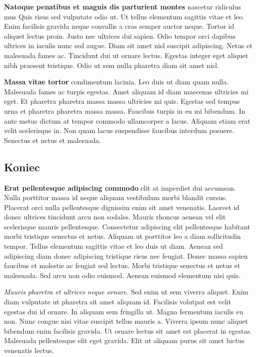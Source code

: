 \documentclass[]{article}
\begin{document}
\textbf{Natoque penatibus et magnis dis parturient montes} nascetur ridiculus mus Quis risus sed vulputate odio ut. Ut tellus elementum sagittis vitae et leo. Enim facilisis gravida neque convallis a cras semper auctor neque. Tortor id aliquet lectus proin. Justo nec ultrices dui sapien. Odio tempor orci dapibus ultrices in iaculis nunc sed augue. Diam sit amet nisl suscipit adipiscing. Netus et malesuada fames ac. Tincidunt dui ut ornare lectus. Egestas integer eget aliquet nibh praesent tristique. Odio ut sem nulla pharetra diam sit amet nisl.

\textbf{Massa vitae tortor} condimentum lacinia. Leo duis ut diam quam nulla. Malesuada fames ac turpis egestas. Amet aliquam id diam maecenas ultricies mi eget. Et pharetra pharetra massa massa ultricies mi quis. Egestas sed tempus urna et pharetra pharetra massa massa. Faucibus turpis in eu mi bibendum. In ante metus dictum at tempor commodo ullamcorper a lacus. Aliquam etiam erat velit scelerisque in. Non quam lacus suspendisse faucibus interdum posuere. Senectus et netus et malesuada.

\subsection{Koniec}
\textbf{Erat pellentesque adipiscing commodo }elit at imperdiet dui accumsan. 
Nulla porttitor massa id neque aliquam vestibulum morbi blandit cursus. Placerat orci nulla pellentesque dignissim enim sit amet venenatis. Laoreet id donec ultrices tincidunt arcu non sodales. Mauris rhoncus aenean vel elit scelerisque mauris pellentesque. Consectetur adipiscing elit pellentesque habitant morbi tristique senectus et netus. Aliquam ut porttitor leo a diam sollicitudin tempor. Tellus elementum sagittis vitae et leo duis ut diam. Aenean sed adipiscing diam donec adipiscing tristique risus nec feugiat. Donec massa sapien faucibus et molestie ac feugiat sed lectus. Morbi tristique senectus et netus et malesuada. Sed arcu non odio euismod. Aenean euismod elementum nisi quis.

\emph{Mauris pharetra et ultrices neque ornare.} Sed enim ut sem viverra aliquet. Enim diam vulputate ut pharetra sit amet aliquam id. Facilisis volutpat est velit egestas dui id ornare. In aliquam sem fringilla ut. Magna fermentum iaculis eu non. Nunc congue nisi vitae suscipit tellus mauris a. Viverra ipsum nunc aliquet bibendum enim facilisis gravida. Ut ornare lectus sit amet est placerat in egestas. Malesuada pellentesque elit eget gravida. Elit ut aliquam purus sit amet luctus venenatis lectus.
\end{document}
